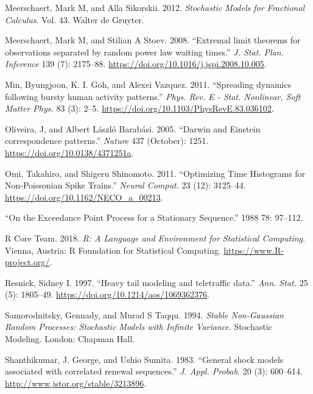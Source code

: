 \documentclass[]{elsarticle} %
\begin{document}
\leavevmode\hypertarget{ref-MeerschaertSikorskii}{}%
Meerschaert, Mark M, and Alla Sikorskii. 2012. \emph{Stochastic Models
for Fractional Calculus}. Vol. 43. Walter de Gruyter.

\leavevmode\hypertarget{ref-MeerschaertStoev08}{}%
Meerschaert, Mark M, and Stilian A Stoev. 2008. ``Extremal limit
theorems for observations separated by random power law waiting times.''
\emph{J. Stat. Plan. Inference} 139 (7): 2175--88.
\url{https://doi.org/10.1016/j.jspi.2008.10.005}.

\leavevmode\hypertarget{ref-Min2010}{}%
Min, Byungjoon, K. I. Goh, and Alexei Vazquez. 2011. ``Spreading
dynamics following bursty human activity patterns.'' \emph{Phys. Rev. E
- Stat. Nonlinear, Soft Matter Phys.} 83 (3): 2--5.
\url{https://doi.org/10.1103/PhysRevE.83.036102}.

\leavevmode\hypertarget{ref-Oliveira2005}{}%
Oliveira, J, and Albert László Barabási. 2005. ``Darwin and Einstein
correspondence patterns.'' \emph{Nature} 437 (October): 1251.
\url{https://doi.org/10.0138/4371251a}.

\leavevmode\hypertarget{ref-Omi2011}{}%
Omi, Takahiro, and Shigeru Shinomoto. 2011. ``Optimizing Time Histograms
for Non-Poissonian Spike Trains.'' \emph{Neural Comput.} 23 (12):
3125--44. \url{https://doi.org/10.1162/NECO_a_00213}.

\leavevmode\hypertarget{ref-Hsing88}{}%
``On the Exceedance Point Process for a Stationary Sequence.'' 1988 78:
97--112.

\leavevmode\hypertarget{ref-R}{}%
R Core Team. 2018. \emph{R: A Language and Environment for Statistical
Computing}. Vienna, Austria: R Foundation for Statistical Computing.
\url{https://www.R-project.org/}.

\leavevmode\hypertarget{ref-Resnick97}{}%
Resnick, Sidney I. 1997. ``Heavy tail modeling and teletraffic data.''
\emph{Ann. Stat.} 25 (5): 1805--49.
\url{https://doi.org/10.1214/aos/1069362376}.

\leavevmode\hypertarget{ref-SamorodnitskyTaqqu}{}%
Samorodnitsky, Gennady, and Murad S Taqqu. 1994. \emph{Stable
Non-Gaussian Random Processes: Stochastic Models with Infinite
Variance}. Stochastic Modeling. London: Chapman Hall.

\leavevmode\hypertarget{ref-Sumita1983}{}%
Shanthikumar, J. George, and Ushio Sumita. 1983. ``General shock models
associated with correlated renewal sequences.'' \emph{J. Appl. Probab.}
20 (3): 600--614. \url{http://www.jstor.org/stable/3213896}.
\end{document}
